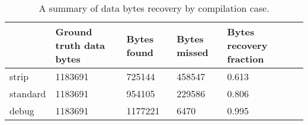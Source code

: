 \begin{table}[htb]
\centering
\caption{A summary of data bytes recovery by compilation case.}
\label{table:opts-bytes-summary}
\begin{tabular}{lp{}p{}p{}p{}p{}}
\toprule
{} &  Ground truth data bytes &  Bytes found &  Bytes missed &  Bytes recovery fraction \\
\midrule
strip    &                  1183691 &       725144 &        458547 &                    0.613 \\
standard &                  1183691 &       954105 &        229586 &                    0.806 \\
debug    &                  1183691 &      1177221 &          6470 &                    0.995 \\
\bottomrule
\end{tabular}
\end{table}

